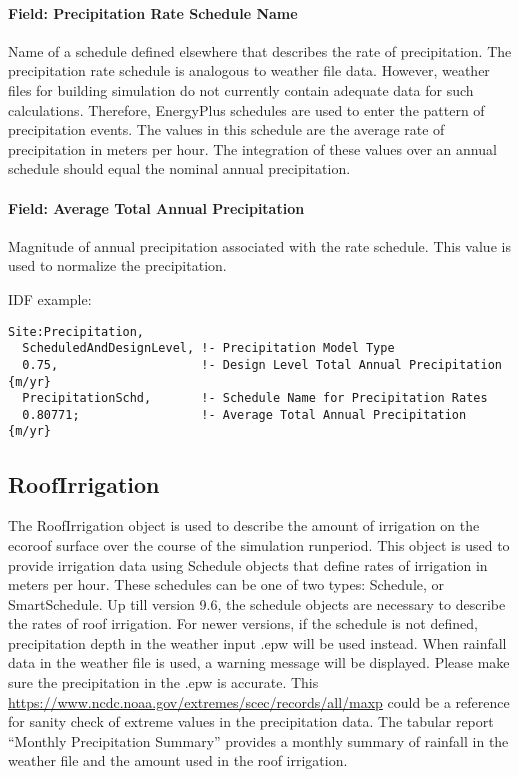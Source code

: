 \paragraph{Field: Precipitation Rate Schedule Name}\label{field-precipitation-rate-schedule-name}

Name of a schedule defined elsewhere that describes the rate of precipitation. The precipitation rate schedule is analogous to weather file data. However, weather files for building simulation do not currently contain adequate data for such calculations. Therefore, EnergyPlus schedules are used to enter the pattern of precipitation events. The values in this schedule are the average rate of precipitation in meters per hour. The integration of these values over an annual schedule should equal the nominal annual precipitation.

\paragraph{Field: Average Total Annual Precipitation}\label{field-average-total-annual-precipitation}

Magnitude of annual precipitation associated with the rate schedule. This value is used to normalize the precipitation.

IDF example:

\begin{lstlisting}
Site:Precipitation,
  ScheduledAndDesignLevel, !- Precipitation Model Type
  0.75,                    !- Design Level Total Annual Precipitation {m/yr}
  PrecipitationSchd,       !- Schedule Name for Precipitation Rates
  0.80771;                 !- Average Total Annual Precipitation {m/yr}
\end{lstlisting}

\subsection{RoofIrrigation}\label{roofirrigation}

The RoofIrrigation object is used to describe the amount of irrigation on the
ecoroof surface over the course of the simulation runperiod. This object is used
to provide irrigation data using Schedule objects that define rates of
irrigation in meters per hour. These schedules can be one of two types:
Schedule, or SmartSchedule. Up till version 9.6, the schedule objects are
necessary to describe the rates of roof irrigation. For newer versions, if the
schedule is not defined, precipitation depth in the weather input .epw will be
used instead. When rainfall data in the weather file is used, a
warning message will be displayed. Please make sure the precipitation in the
.epw is accurate. This \href{table by the State Climate Extreme
Committee}{https://www.ncdc.noaa.gov/extremes/scec/records/all/maxp} could be a
reference for sanity check of extreme values in the precipitation data. The
tabular report ``Monthly Precipitation Summary'' provides a monthly summary of
rainfall in the weather file and the amount used in the roof irrigation.

